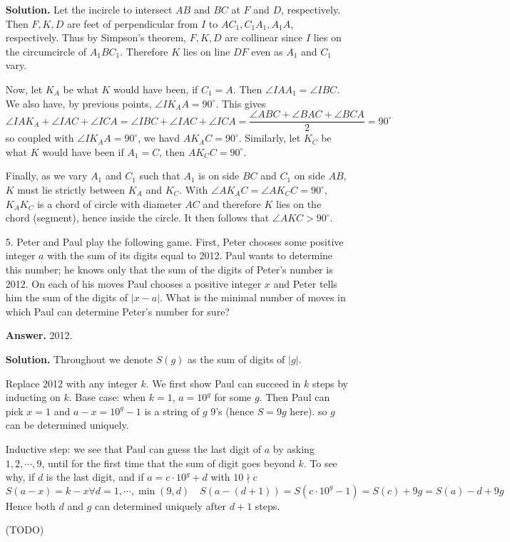 \documentclass[11pt,a4paper]{article}
\begin{document}
\begin{enumerate}
	\textbf{Solution.} 
	Let the incircle to intersect $AB$ and $BC$ at $F$ and $D$, respectively. 
	Then $F, K, D$ are feet of perpendicular from $I$ to $AC_1, C_1A_1, A_1A$, respectively. 
	Thus by Simpson's theorem, $F, K, D$ are collinear since $I$ lies on the circumcircle of $A_1BC_1$. 
	Therefore $K$ lies on line $DF$ even as $A_1$ and $C_1$ vary. 
	
	Now, let $K_A$ be what $K$ would have been, if $C_1=A$. 
	Then $\angle IAA_1=\angle IBC$. 
	We also have, by previous points, $\angle IK_AA=90^{\circ}$. 
	This gives 
	\[
	\angle IAK_A+\angle IAC+\angle ICA = 
	\angle IBC + \angle IAC+\angle ICA 
	=\frac{\angle ABC+\angle BAC+\angle BCA}{2}
	=90^{\circ}
	\]
	so coupled with $\angle IK_AA=90^{\circ}$, 
	we havd $AK_AC=90^{\circ}$. 
	Similarly, let $K_C$ be what $K$ would have been if $A_1=C$, then $AK_CC=90^{\circ}$. 
	
	Finally, as we vary $A_1$ and $C_1$ such that $A_1$ is on side $BC$ and $C_1$ on side $AB$, 
	$K$ must lie strictly between $K_A$ and $K_C$. 
	With $\angle AK_AC=\angle AK_CC=90^{\circ}$, 
	$K_AK_C$ is a chord of circle with diameter $AC$ and therefore 
	$K$ lies on the chord (segment), hence inside the circle. 
	It then follows that $\angle AKC>90^{\circ}$. 
	
	\item[5.] 
	Peter and Paul play the following game. First, Peter chooses some positive integer $a$ with
	the sum of its digits equal to 2012. Paul wants to determine this number; he knows only
	that the sum of the digits of Peter’s number is 2012. On each of his moves Paul chooses a
	positive integer $x$ and Peter tells him the sum of the digits of $|x - a|$. What is the minimal
	number of moves in which Paul can determine Peter’s number for sure?
	
	\textbf{Answer.} 2012. 
	
	\textbf{Solution.} Throughout we denote $S(g)$ as the sum of digits of $|g|$. 
	
	Replace 2012 with any integer $k$. 
	We first show Paul can succeed in $k$ steps by inducting on $k$. 
	Base case: when $k=1$, $a=10^g$ for some $g$. 
	Then Paul can pick $x=1$ and $a-x=10^g-1$ is a string of $g$ 9's (hence $S=9g$ here). 
	so $g$ can be determined uniquely. 
	
	Inductive step: we see that Paul can guess the last digit of $a$ by asking $1, 2, \cdots, 9$, until for the first time that the sum of digit goes beyond $k$. 
	To see why, if $d$ is the last digit, and if $a=c\cdot 10^g+d$ with $10\nmid c$
	\[
	S(a-x) = k - x\forall d=1, \cdots, \min(9, d)
	\quad 
	S(a-(d+1)) = S(c\cdot 10^g - 1) = S(c) + 9g = S(a) - d + 9g
	\]
	Hence both $d$ and $g$ can determined uniquely after $d+1$ steps. 
	
	(TODO)
\end{enumerate}
\end{document}

